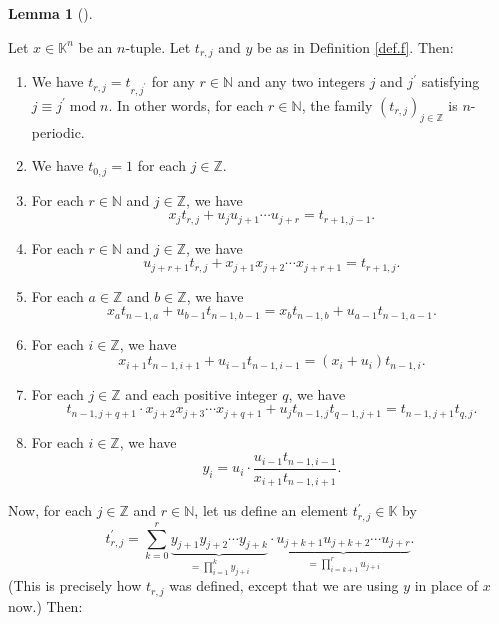 \documentclass[numbers=enddot,12pt,final,onecolumn,notitlepage]{scrartcl}%
\theoremstyle{definition}
\newtheorem{lem}[theo]{Lemma}
\newenvironment{lemma}[1][]
{\begin{lem}[#1]\begin{leftbar}}
{\end{leftbar}\end{lem}}
\let\sumnonlimits\sum
\let\prodnonlimits\prod
\renewcommand{\sum}{\sumnonlimits\limits}
\renewcommand{\prod}{\prodnonlimits\limits}
\begin{document}
\begin{lemma}
\label{lem.f.steps}Let $x\in\mathbb{K}^{n}$ be an $n$-tuple. Let $t_{r,j}$ and
$y$ be as in Definition \ref{def.f}. Then:

\begin{enumerate}
\item[\textbf{(a)}] We have $t_{r,j}=t_{r,j^{\prime}}$ for any $r\in
\mathbb{N}$ and any two integers $j$ and $j^{\prime}$ satisfying $j\equiv
j^{\prime}\operatorname{mod}n$. In other words, for each $r\in\mathbb{N}$, the
family $\left(  t_{r,j}\right)  _{j\in\mathbb{Z}}$ is $n$-periodic.

\item[\textbf{(b)}] We have $t_{0,j}=1$ for each $j\in\mathbb{Z}$.

\item[\textbf{(c)}] For each $r\in\mathbb{N}$ and $j\in\mathbb{Z}$, we have%
\[
x_{j}t_{r,j}+u_{j}u_{j+1}\cdots u_{j+r}=t_{r+1,j-1}.
\]


\item[\textbf{(d)}] For each $r\in\mathbb{N}$ and $j\in\mathbb{Z}$, we have%
\[
u_{j+r+1}t_{r,j}+x_{j+1}x_{j+2}\cdots x_{j+r+1}=t_{r+1,j}.
\]


\item[\textbf{(e)}] For each $a\in\mathbb{Z}$ and $b\in\mathbb{Z}$, we have%
\[
x_{a}t_{n-1,a}+u_{b-1}t_{n-1,b-1}=x_{b}t_{n-1,b}+u_{a-1}t_{n-1,a-1}.
\]


\item[\textbf{(f)}] For each $i\in\mathbb{Z}$, we have%
\[
x_{i+1}t_{n-1,i+1}+u_{i-1}t_{n-1,i-1}=\left(  x_{i}+u_{i}\right)  t_{n-1,i}.
\]


\item[\textbf{(g)}] For each $j\in\mathbb{Z}$ and each positive integer $q$,
we have%
\[
t_{n-1,j+q+1}\cdot x_{j+2}x_{j+3}\cdots x_{j+q+1}+u_{j}t_{n-1,j}%
t_{q-1,j+1}=t_{n-1,j+1}t_{q,j}.
\]


\item[\textbf{(h)}] For each $i\in\mathbb{Z}$, we have%
\[
y_{i}=u_{i}\cdot\dfrac{u_{i-1}t_{n-1,i-1}}{x_{i+1}t_{n-1,i+1}}.
\]

\end{enumerate}

Now, for each $j\in\mathbb{Z}$ and $r\in\mathbb{N}$, let us define an element
$t_{r,j}^{\prime}\in\mathbb{K}$ by
\[
t_{r,j}^{\prime}=\sum_{k=0}^{r}\underbrace{y_{j+1}y_{j+2}\cdots y_{j+k}%
}_{=\prod_{i=1}^{k}y_{j+i}}\cdot\underbrace{u_{j+k+1}u_{j+k+2}\cdots u_{j+r}%
}_{=\prod_{i=k+1}^{r}u_{j+i}}.
\]
(This is precisely how $t_{r,j}$ was defined, except that we are using $y$ in
place of $x$ now.) Then:


\end{lemma}
\end{document}
